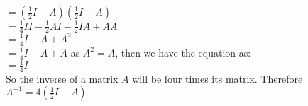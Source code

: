 \documentclass[12pt, oneside]{article}   	%
\begin{document}
\begin{enumerate}
\begin{enumerate}
		\hspace{2cm} $=(\frac{1}{2}I-A)(\frac{1}{2}I-A)$\\
		
		
		\hspace{2cm}$=\frac{1}{4}II-\frac{1}{2}AI-\frac{1}{2}IA+AA$\\
		
		\hspace{2cm}$=\frac{1}{4}I-A+A^2$\\
		
		\hspace{2cm}$=\frac{1}{4}I-A+A$      as $A^2=A$, then we have the equation as:\\
		
		\hspace{2cm}$=\frac{1}{4}I$\\
		
		So the inverse of a matrix $A$ will be four times its matrix. Therefore\\ $A^{-1}=4(\frac{1}{2}I-A)$
		
	\end{enumerate}
    \end{enumerate}
\end{document}
